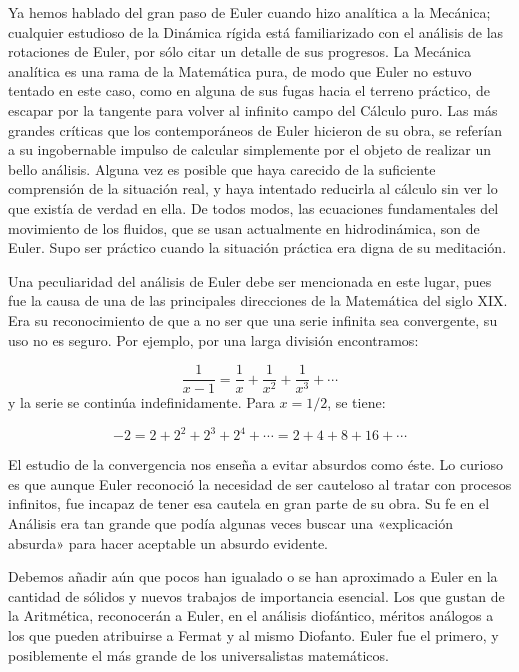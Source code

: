 \documentclass[a4paper, 12pt]{article}
\begin{document}
Ya hemos hablado del gran paso de Euler cuando hizo analítica a la Mecánica; cualquier estudioso de la Dinámica rígida está familiarizado con el análisis de las rotaciones de Euler, por sólo citar un detalle de sus progresos. La Mecánica analítica es una rama de la Matemática pura, de modo que Euler no estuvo tentado en este caso, como en alguna de sus fugas hacia el terreno práctico, de escapar por la tangente para volver al infinito campo del Cálculo puro. Las más grandes críticas que los contemporáneos de Euler hicieron de su obra, se referían a su ingobernable impulso de calcular simplemente por el objeto de realizar un bello análisis. Alguna vez es posible que haya carecido de la suficiente comprensión de la situación real, y haya intentado reducirla al cálculo sin ver lo que existía de verdad en ella. De todos modos, las ecuaciones fundamentales del movimiento de los fluidos, que se usan actualmente en hidrodinámica, son de Euler. Supo ser práctico cuando la situación práctica era digna de su meditación.

Una peculiaridad del análisis de Euler debe ser mencionada en este lugar, pues fue la causa de una de las principales direcciones de la Matemática del siglo XIX. Era su reconocimiento de que a no ser que una serie infinita sea convergente, su uso no es seguro. Por ejemplo, por una larga división encontramos:

\vspace{-1em}
\[
\frac{1}{x-1}= \frac{1}{x}+\frac{1}{x^2}+\frac{1}{x^3}+ \cdots
\]
y la serie se continúa indefinidamente. Para $x = 1/2$, se tiene:

\vspace{-1em}
\[
-2 = 2 + 2^2 + 2^3 + 2^4 + \cdots = 2 + 4 + 8 + 16 + \cdots
\]

El estudio de la convergencia  nos enseña a evitar absurdos como éste. Lo curioso es que aunque Euler reconoció la necesidad de ser cauteloso al tratar con procesos infinitos, fue incapaz de tener esa cautela en gran parte de su obra. Su fe en el Análisis era tan grande que podía algunas veces buscar una «explicación absurda» para hacer aceptable un absurdo evidente.

Debemos añadir aún que pocos han igualado o se han aproximado a Euler en la cantidad de sólidos y nuevos trabajos de importancia esencial. Los que gustan de la Aritmética, reconocerán a Euler, en el análisis diofántico, méritos análogos a los que pueden atribuirse a Fermat y al mismo Diofanto. Euler fue el primero, y posiblemente el más grande de los universalistas matemáticos.
\end{document}
